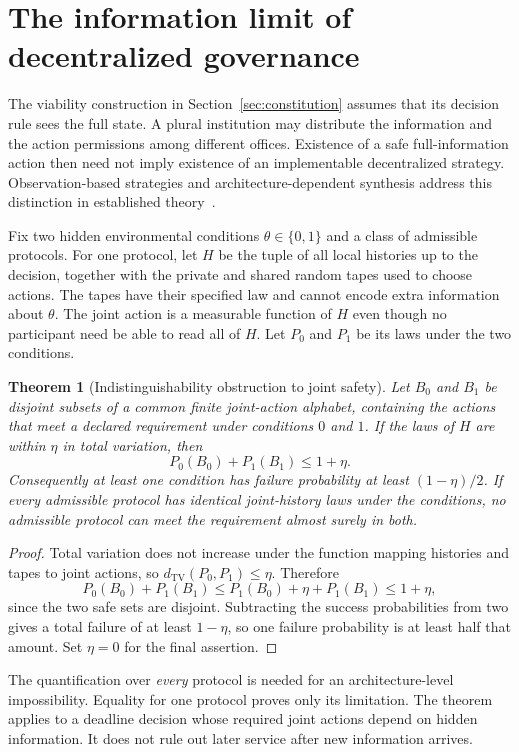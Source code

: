 \documentclass[11pt,letterpaper]{article}
\theoremstyle{plain}
\newtheorem{theorem}[proposition]{Theorem}
\theoremstyle{definition}
\theoremstyle{remark}
\newcommand{\TV}{d_{\mathrm{TV}}}
\begin{document}
\section{The information limit of decentralized governance}\label{sec:decentral}
The viability construction in Section~\ref{sec:constitution} assumes that its decision rule sees the full state. A plural institution may distribute the information and the action permissions among different offices. Existence of a safe full-information action then need not imply existence of an implementable decentralized strategy. Observation-based strategies and architecture-dependent synthesis address this distinction in established theory~\cite{chatterjee,pnuelirosner}.

Fix two hidden environmental conditions $\theta\in\{0,1\}$ and a class of admissible protocols. For one protocol, let $H$ be the tuple of all local histories up to the decision, together with the private and shared random tapes used to choose actions. The tapes have their specified law and cannot encode extra information about $\theta$. The joint action is a measurable function of $H$ even though no participant need be able to read all of $H$. Let $P_0$ and $P_1$ be its laws under the two conditions.

\begin{theorem}[Indistinguishability obstruction to joint safety]\label{thm:decsafe}
Let $B_0$ and $B_1$ be disjoint subsets of a common finite joint-action alphabet, containing the actions that meet a declared requirement under conditions $0$ and $1$. If the laws of $H$ are within $\eta$ in total variation, then
\[
P_0(B_0)+P_1(B_1)\leq1+\eta.
\]
Consequently at least one condition has failure probability at least $(1-\eta)/2$. If every admissible protocol has identical joint-history laws under the conditions, no admissible protocol can meet the requirement almost surely in both.
\end{theorem}
\begin{proof}
Total variation does not increase under the function mapping histories and tapes to joint actions, so $\TV(P_0,P_1)\leq\eta$. Therefore
\[
P_0(B_0)+P_1(B_1)
\leq P_1(B_0)+\eta+P_1(B_1)\leq1+\eta,
\]
since the two safe sets are disjoint. Subtracting the success probabilities from two gives a total failure of at least $1-\eta$, so one failure probability is at least half that amount. Set $\eta=0$ for the final assertion.
\end{proof}

The quantification over \emph{every} protocol is needed for an architecture-level impossibility. Equality for one protocol proves only its limitation. The theorem applies to a deadline decision whose required joint actions depend on hidden information. It does not rule out later service after new information arrives.
\end{document}
